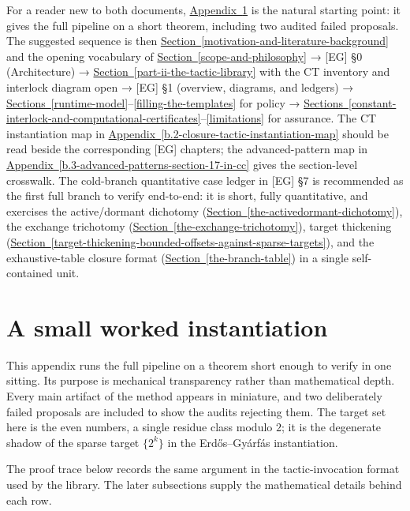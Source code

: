 \documentclass[
  11pt,
]{article}
\theoremstyle{definition}
\newcommand{\secref}[1]{\hyperref[#1]{Section~\ref*{#1}}}
\newcommand{\secrange}[2]{\hyperref[#1]{Sections~\ref*{#1}}--\hyperref[#2]{\ref*{#2}}}
\newcommand{\appref}[1]{\hyperref[#1]{Appendix~\ref*{#1}}}
\begin{document}
For a reader new to both documents, \appref{appendix-c.-a-small-worked-instantiation} is the natural starting
point: it gives the full pipeline on a short theorem, including two
audited failed proposals. The suggested sequence is then
\secref{motivation-and-literature-background} and the opening vocabulary
of \secref{scope-and-philosophy} → {[}EG{]} §0 (Architecture) →
\secref{part-ii-the-tactic-library} with the CT inventory and interlock
diagram open → {[}EG{]} §1 (overview, diagrams, and ledgers) →
\secrange{runtime-model}{filling-the-templates} for policy →
\secrange{constant-interlock-and-computational-certificates}{limitations}
for assurance.  The CT
instantiation map in \appref{b.2-closure-tactic-instantiation-map} should be read beside the
corresponding {[}EG{]} chapters; the advanced-pattern map in
\appref{b.3-advanced-patterns-section-17-in-cc} gives the section-level
crosswalk. The cold-branch quantitative case
ledger in {[}EG{]} §7 is recommended as the first full branch to verify
end-to-end: it is short, fully quantitative, and exercises the
active/dormant dichotomy (\secref{the-activedormant-dichotomy}), the exchange trichotomy (\secref{the-exchange-trichotomy}), target
thickening (\secref{target-thickening-bounded-offsets-against-sparse-targets}), and the exhaustive-table closure format (\secref{the-branch-table}) in a
single self-contained unit.

\section{A small worked
instantiation}\label{appendix-c.-a-small-worked-instantiation}

This appendix runs the full pipeline on a theorem short enough to verify
in one sitting. Its purpose is mechanical transparency rather than
mathematical depth. Every main artifact of the method appears in
miniature, and two deliberately failed proposals are included to show
the audits rejecting them. The target set here is the even numbers, a
single residue class modulo \(2\); it is the degenerate shadow of the
sparse target \(\{2^k\}\) in the Erdős--Gyárfás instantiation.

The proof trace below records the same argument in the tactic-invocation
format used by the library. The later subsections supply the
mathematical details behind each row.
\end{document}
